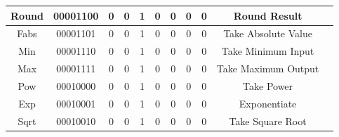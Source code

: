 \documentclass[letter,14pt]{article}
\begin{document}
\begin{table}[H]
\begin{tabular}{lllllllllll}
\multicolumn{1}{|c|}{Round} & \multicolumn{1}{c|}{00001100} & \multicolumn{1}{c|}{0} & \multicolumn{1}{c|}{0} & \multicolumn{1}{c|}{1} & \multicolumn{1}{c|}{0} & \multicolumn{1}{c|}{0} & \multicolumn{1}{c|}{0} & \multicolumn{1}{c|}{0} & \multicolumn{1}{c|}{Round Result} \TBstrut \\[1em] \hline
\multicolumn{1}{|c|}{Fabs} & \multicolumn{1}{c|}{00001101} & \multicolumn{1}{c|}{0} & \multicolumn{1}{c|}{0} & \multicolumn{1}{c|}{1} & \multicolumn{1}{c|}{0} & \multicolumn{1}{c|}{0} & \multicolumn{1}{c|}{0} & \multicolumn{1}{c|}{0} & \multicolumn{1}{c|}{Take Absolute Value} \TBstrut \\[1em] \hline
\multicolumn{1}{|c|}{Min} & \multicolumn{1}{c|}{00001110} & \multicolumn{1}{c|}{0} & \multicolumn{1}{c|}{0} & \multicolumn{1}{c|}{1} & \multicolumn{1}{c|}{0} & \multicolumn{1}{c|}{0} & \multicolumn{1}{c|}{0} & \multicolumn{1}{c|}{0} & \multicolumn{1}{c|}{Take Minimum Input} \TBstrut \\[1em] \hline
\multicolumn{1}{|c|}{Max} & \multicolumn{1}{c|}{00001111} & \multicolumn{1}{c|}{0} & \multicolumn{1}{c|}{0} & \multicolumn{1}{c|}{1} & \multicolumn{1}{c|}{0} & \multicolumn{1}{c|}{0} & \multicolumn{1}{c|}{0} & \multicolumn{1}{c|}{0}  & \multicolumn{1}{c|}{Take Maximum Output} \TBstrut \\[1em] \hline
\multicolumn{1}{|c|}{Pow} & \multicolumn{1}{c|}{00010000} & \multicolumn{1}{c|}{0} & \multicolumn{1}{c|}{0} & \multicolumn{1}{c|}{1} & \multicolumn{1}{c|}{0} & \multicolumn{1}{c|}{0} & \multicolumn{1}{c|}{0} & \multicolumn{1}{c|}{0}  & \multicolumn{1}{c|}{Take Power} \TBstrut \\[1em] \hline
\multicolumn{1}{|c|}{Exp} & \multicolumn{1}{c|}{00010001} & \multicolumn{1}{c|}{0} & \multicolumn{1}{c|}{0} & \multicolumn{1}{c|}{1} & \multicolumn{1}{c|}{0} & \multicolumn{1}{c|}{0} & \multicolumn{1}{c|}{0} & \multicolumn{1}{c|}{0} & \multicolumn{1}{c|}{Exponentiate} \TBstrut \\[1em] \hline
\multicolumn{1}{|c|}{Sqrt} & \multicolumn{1}{c|}{00010010} & \multicolumn{1}{c|}{0} & \multicolumn{1}{c|}{0} & \multicolumn{1}{c|}{1} & \multicolumn{1}{c|}{0} & \multicolumn{1}{c|}{0} & \multicolumn{1}{c|}{0} & \multicolumn{1}{c|}{0} & \multicolumn{1}{c|}{Take Square Root} \TBstrut \\[1em] \hline


\end{tabular}
\end{table}
\end{document}
